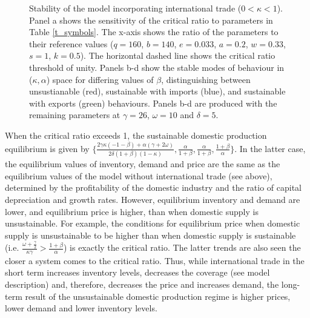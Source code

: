 \documentclass[12pt]{article}
\begin{document}
\begin{figure}[t!]
  \caption{Stability of the model incorporating international trade ($0 < \kappa < 1$). Panel a shows the sensitivity of the critical ratio to parameters in Table \ref{t_symbols}. The x-axis shows the ratio of the parameters to their reference values ($q = 160$, $b = 140$, $e = 0.033$, $a = 0.2$, $w = 0.33$, $s=1$, $k=0.5$). The horizontal dashed line shows the critical ratio threshold of unity. Panels b-d show the stable modes of behaviour in ($\kappa, \alpha$) space for differing values of $\beta$, distinguishing between unsustianable (red), sustainable with imports (blue), and sustainable with exports (green) behaviours. Panels b-d are produced with the remaining parameters at $\gamma = 26$, $\omega = 10$ and $\delta = 5$.}
  \label{figure2}
\end{figure}

When the critical ratio exceeds 1, the sustainable domestic production equilibrium is given by $\{\frac{2 \gamma \kappa (- 1 - \beta) + \alpha (\gamma + 2 \omega)}{2 \delta (1+\beta)(1 - \kappa) }, \frac{\alpha}{1 + \beta}, \frac{\alpha}{1 + \beta}, \frac{1 + \beta}{\alpha}\}$. In the latter case, the equilibrium values of inventory, demand and price are the same as the equilibrium values of the model without international trade (see above), determined by the profitability of the domestic industry and the ratio of capital depreciation and growth rates. However, equilibrium inventory and demand are lower, and equilibrium price is higher, than when domestic supply is unsustainable. For example, the conditions for equilibrium price when domestic supply is unsustainable to be higher than when domestic supply is sustainable (i.e. $\frac{\omega + \frac{\gamma}{2}}{\kappa \gamma} > \frac{1 + \beta}{\alpha}$) is exactly the critical ratio. The latter trends are also seen the closer a system comes to the critical ratio. Thus, while international trade in the short term increases inventory levels, decreases the coverage (see model description) and, therefore, decreases the price and increases demand, the long-term result of the unsustainable domestic production regime is higher prices, lower demand and lower inventory levels.
\end{document}
